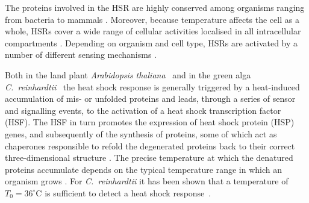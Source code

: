 \documentclass[oneside, 10pt, a4paper, twocolumn]{article}
\begin{document}
The proteins involved in the HSR are highly conserved among organisms ranging from bacteria to %
mammals \cite{Boorstein1994,Gupta1995}. 
Moreover, because temperature affects the cell as a whole, HSRs cover a wide range of cellular activities 
localised in all intracellular compartments \cite{Verghesea2012,Velichko2013}. 
Depending on organism and cell type, HSRs are activated by a number of different sensing mechanisms \cite{Richter2010}. 

Both in the land plant \textit{Arabidopsis thaliana}~\cite{Kurepa2003,Sugio2009} and in the green alga \textit{C.~reinhardtii}~\cite{Schmollinger2013}
the heat shock response is generally triggered by a heat-induced accumulation of mis- or unfolded proteins
and leads, through a series of sensor and signalling events, to the activation
of a heat shock transcription factor (HSF). The HSF in turn promotes the expression of 
heat shock protein (HSP) genes, and subsequently of the synthesis of proteins, some of which act as chaperones responsible to refold the degenerated proteins back to
their correct three-dimensional structure \cite{Craig1993}. 
The precise temperature at which the denatured proteins accumulate depends on the typical temperature range
in which an organism grows \cite{Lindquist1988}. 
For \textit{C.~reinhardtii}
it has been shown that a temperature of $T_0 = 36^\circ\text{C}$ is sufficient to detect a heat shock response~\cite{Kobayashi2014}.
\end{document}
